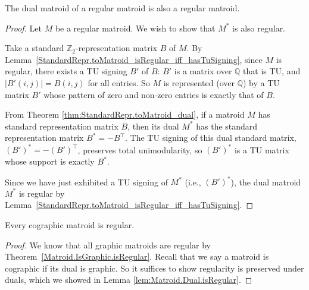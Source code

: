 \begin{lemma}
    \label{lem:Matroid.Dual.isRegular}
    The dual matroid of a regular matroid is also a regular matroid.
\end{lemma}

\begin{proof}
    Let $M$ be a regular matroid. We wish to show that $M^{*}$ is also regular. 
    
    Take a standard $ \mathbb Z_2$-representation matrix $B$ of $M$. By Lemma~\ref{StandardRepr.toMatroid_isRegular_iff_hasTuSigning}, since $M$ is regular, there exists a TU signing $B'$ of $B$: $B'$ is a matrix over $\mathbb Q$ that is TU, and $|B'(i,j)| = B(i,j)$ for all entries.  So $M$ is represented (over $\mathbb Q$) by a TU matrix $B'$ whose pattern of zero and non-zero entries is exactly that of $B$.

    From Theorem \ref{thm:StandardRepr.toMatroid_dual}, if a matroid $M$ has standard representation matrix $B$, then its dual $M^{*}$ has the standard representation matrix $B^{*} = -B^{\intercal}$. The TU signing of this dual standard matrix, $(B')^{*} = -(B')^{\intercal}$, preserves total unimodularity, so $(B')^{*}$ is a TU matrix whose support is exactly $B^{*}$.

    Since we have just exhibited a TU signing of $M^{*}$ (i.e., $(B')^{*}$), the dual matroid $M^{*}$ is regular by Lemma~\ref{StandardRepr.toMatroid_isRegular_iff_hasTuSigning}.
\end{proof}

\begin{theorem}
    \label{Matroid.IsCographic.isRegular}
    Every cographic matroid is regular.
\end{theorem}

\begin{proof}
    We know that all graphic matroids are regular by Theorem~\ref{Matroid.IsGraphic.isRegular}. Recall that we say a matroid is cographic if its dual is graphic. So it suffices to show regularity is preserved under duals, which we showed in Lemma \ref{lem:Matroid.Dual.isRegular}.
\end{proof}